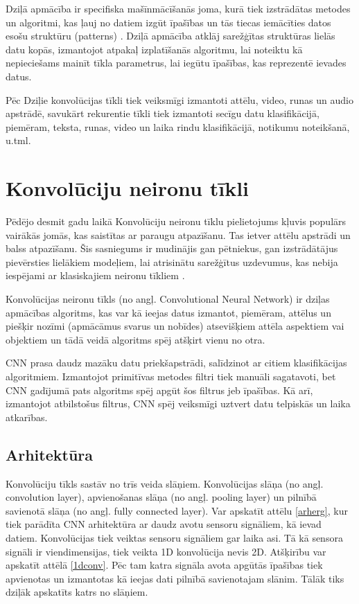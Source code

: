 \documentclass[12pt,paper=A4]{report}
\begin{document}
Dziļā apmācība ir specifiska mašīnmācīšanās joma, kurā tiek izstrādātas metodes un algoritmi, kas ļauj no datiem izgūt īpašības un tās tiecas iemācīties datos esošu struktūru (patterns) \cite{lecun2015deep}. Dziļā apmācība atklāj sarežģītas struktūras lielās datu kopās, izmantojot atpakaļ izplatīšanās algoritmu, lai noteiktu kā nepieciešams mainīt tīkla parametrus, lai iegūtu īpašības, kas reprezentē ievades datus. 
	
Pēc Dziļie konvolūcijas tīkli tiek veiksmīgi izmantoti attēlu, video, runas un audio apstrādē, savukārt rekurentie tīkli tiek izmantoti secīgu datu klasifikācijā, piemēram, teksta, runas, video un laika rindu klasifikācijā, notikumu noteikšanā, u.tml.

	
\section{Konvolūciju neironu tīkli}

Pēdējo desmit gadu laikā Konvolūciju neironu tīklu pielietojums kļuvis populārs vairākās jomās, kas saistītas ar paraugu atpazīšanu. Tas ietver attēlu apstrādi un balss atpazīšanu. Šis sasniegums ir mudinājis gan
pētniekus, gan izstrādātājus pievērsties lielākiem modeļiem, lai atrisinātu sarežģītus uzdevumus, kas nebija iespējami ar klasiskajiem neironu tīkliem \cite{chen2018rise}.

Konvolūcijas neironu tīkls (no angļ. Convolutional Neural Network) ir dziļas apmācības algoritms, kas var kā ieejas datus izmantot, piemēram, attēlus un piešķir nozīmi (apmācāmus svarus un nobīdes) atsevišķiem attēla aspektiem vai objektiem un tādā veidā algoritms spēj atšķirt vienu no otra. 

CNN prasa daudz mazāku datu priekšapstrādi, salīdzinot ar citiem klasifikācijas algoritmiem. Izmantojot primitīvas metodes filtri tiek manuāli sagatavoti, bet CNN gadījumā pats algoritms spēj apgūt šos filtrus jeb īpašības. Kā arī, izmantojot atbilstošus filtrus, CNN spēj veiksmīgi uztvert datu telpiskās un laika atkarības. 


\subsection{Arhitektūra}

Konvolūciju tīkls sastāv no trīs veida slāņiem. Konvolūcijas slāņa (no angļ. convolution layer), apvienošanas slāņa (no angļ. pooling layer) un pilnībā savienotā slāņa (no angļ. fully connected layer). Var apskatīt attēlu \ref{arherg}, kur tiek parādīta CNN arhitektūra ar daudz avotu sensoru signāliem, kā ievad datiem. Konvolūcijas tiek veiktas sensoru signāliem gar laika asi. Tā kā sensora signāli ir viendimensijas, tiek veikta 1D konvolūcija nevis 2D. Atšķirību var apskatīt attēlā \ref{1dconv}. Pēc tam katra signāla avota apgūtās īpašības tiek apvienotas un izmantotas kā ieejas dati pilnībā savienotajam slānim. Tālāk tiks dziļāk apskatīts katrs no slāņiem. 
\end{document}
